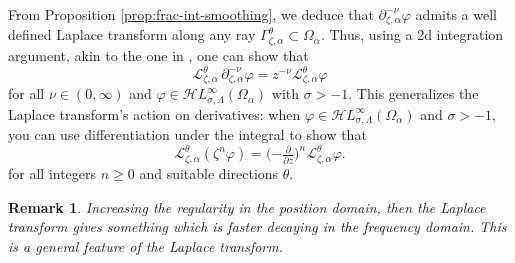 \documentclass{article}
\theoremstyle{plain}
\newtheorem{rmk}{Remark}
\newcommand{\laplace}{\mathcal{L}}
\newcommand{\fracderiv}[3]{\partial^{#1}_{#2, #3}}
\newcommand{\singexp}[2]{\mathcal{H}L^\infty_{#1, #2}}
\newcommand{\domain}{\Omega}
\begin{document}
From Proposition \ref{prop:frac-int-smoothing}, we deduce that $\fracderiv{-\nu}{\zeta}{\alpha}\varphi$ admits a well defined Laplace transform along any ray $\Gamma_{\zeta,\alpha}^{\theta}\subset\domain_\alpha$. Thus, using a 2d integration argument, akin to the one in \cite[Theorem~2.39]{laplace-tfm}, one can show that 
\[ \laplace_{\zeta,\alpha}^{\theta}\,\fracderiv{-\nu}{\zeta}{\alpha} \varphi = z^{-\nu} \laplace_{\zeta, \alpha}^{\theta} \varphi \]
for all $\nu \in (0, \infty)$ and $\varphi\in\singexp{\sigma}{\Lambda}(\domain_\alpha)$ with $\sigma>-1$. This generalizes the Laplace transform's action on derivatives: when $\varphi \in \singexp{\sigma}{\Lambda}(\domain_\alpha)$ and $\sigma>-1$, you can use differentiation under the integral to show that~\cite[Theorem~1.34]{laplace-tfm}
\begin{equation}%
\laplace_{\zeta,\alpha}^\theta (\zeta^n \varphi) = \big({-\tfrac{\partial}{\partial z}}\big)^n \laplace_{\zeta,\alpha}^\theta \varphi.
\end{equation}
for all integers $n \ge 0$ and suitable directions $\theta$.

\begin{rmk}
Increasing the regularity in the position domain, then the Laplace transform gives something which is faster decaying in the frequency domain. This is a general feature of the Laplace transform.
\end{rmk}
\end{document}
